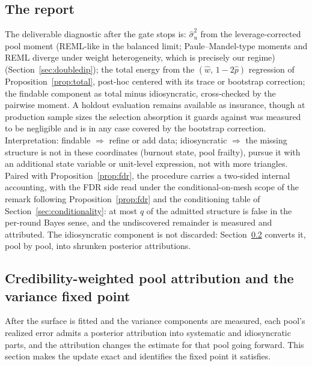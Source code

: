\documentclass[11pt]{article}
\begin{document}
\subsection{The report}
The deliverable diagnostic after the gate stops is:
$\hat\sigma_u^2$ from the leverage-corrected pool moment (REML-like in the balanced limit; Paule--Mandel-type moments and REML diverge under weight heterogeneity, which is precisely our regime)
(Section~\ref{sec:doubledip}); the total energy from the $(\hat w,\,1-2\hat p)$
regression of Proposition~\ref{prop:total}, post-hoc centered with its trace or
bootstrap correction; the findable component as total minus idiosyncratic,
cross-checked by the pairwise moment. A holdout evaluation remains available as
insurance, though at production sample sizes the selection absorption it guards
against was measured to be negligible and is in any case covered by the bootstrap
correction.
Interpretation: findable $\Rightarrow$ refine or add data; idiosyncratic
$\Rightarrow$ the missing structure is not in these coordinates (burnout state, pool
frailty), pursue it with an additional state variable or unit-level expression, not
with more triangles. Paired with Proposition~\ref{prop:fdr}, the procedure carries a
two-sided internal accounting, with the FDR side read under the conditional-on-mesh scope of the remark following Proposition~\ref{prop:fdr} and the conditioning table of Section~\ref{sec:conditionality}: at most $q$ of the admitted structure is false in the per-round Bayes sense, and the
undiscovered remainder is measured and attributed. The idiosyncratic component is not
discarded: Section~\ref{sec:posthoc} converts it, pool by pool, into shrunken
posterior attributions.


\subsection{Credibility-weighted pool attribution and the variance fixed point}\label{sec:posthoc}

After the surface is fitted and the variance components are measured, each pool's
realized error admits a posterior attribution into systematic and idiosyncratic parts,
and the attribution changes the estimate for that pool going forward. This section
makes the update exact and identifies the fixed point it satisfies.
\end{document}
